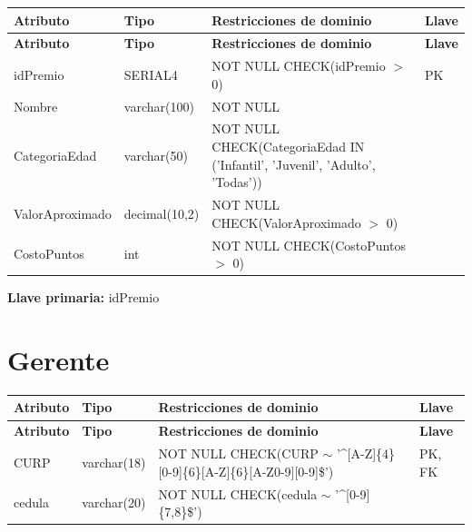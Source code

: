 \documentclass[12pt]{article}
\begin{document}
\begin{longtable}{p{3.5cm} p{2.5cm} p{7.5cm} p{1.5cm}}
\label{tab:premio}\\
\toprule
\textbf{Atributo} & \textbf{Tipo} & \textbf{Restricciones de dominio} & \textbf{Llave} \\
\midrule
\endfirsthead

\toprule
\textbf{Atributo} & \textbf{Tipo} & \textbf{Restricciones de dominio} & \textbf{Llave} \\
\midrule
\endhead

\bottomrule
\endfoot

idPremio 
& SERIAL4 
& NOT NULL \newline CHECK(idPremio $>$ 0)
& PK \\

Nombre 
& varchar(100) 
& NOT NULL
&  \\

CategoriaEdad 
& varchar(50) 
& NOT NULL \newline CHECK(CategoriaEdad IN ('Infantil', 'Juvenil', 'Adulto', 'Todas'))
&  \\

ValorAproximado 
& decimal(10,2) 
& NOT NULL \newline CHECK(ValorAproximado $>$ 0)
&  \\

CostoPuntos 
& int 
& NOT NULL \newline CHECK(CostoPuntos $>$ 0)
&  \\

\end{longtable}

\vspace{2pt}
\textbf{Llave primaria:} idPremio\\

\section*{Gerente}

\begin{longtable}{p{3.5cm} p{2.5cm} p{7.5cm} p{1.5cm}}
\label{tab:gerente}\\
\toprule
\textbf{Atributo} & \textbf{Tipo} & \textbf{Restricciones de dominio} & \textbf{Llave} \\
\midrule
\endfirsthead

\toprule
\textbf{Atributo} & \textbf{Tipo} & \textbf{Restricciones de dominio} & \textbf{Llave} \\
\midrule
\endhead

\bottomrule
\endfoot

CURP 
& varchar(18) 
& NOT NULL \newline CHECK(CURP $\sim$ '\^{}[A-Z]\{4\}[0-9]\{6\}[A-Z]\{6\}[A-Z0-9][0-9]\$')
& PK, FK \\

cedula 
& varchar(20)
& NOT NULL \newline CHECK(cedula $\sim$ '\^{}[0-9]\{7,8\}\$')
& \\

\end{longtable}
\end{document}
